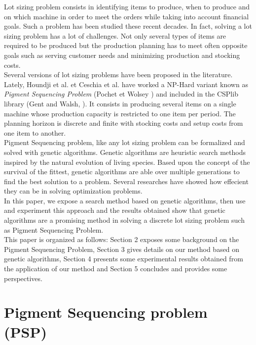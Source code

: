 \documentclass[twocolumn,10pt]{asme2ej}
\begin{document}
Lot sizing problem consists in identifying items to produce, when to produce and on which machine in order to meet the orders while taking into account financial goals. Such a problem has been studied these recent decades. In fact, solving a lot sizing problem has a lot of challenges. Not only several types of items are required to be produced but the production planning has to meet often opposite goals such as serving customer needs and minimizing production and stocking costs.\\
Several versions of lot sizing problems have been proposed in the literature. Lately,  Houndji et al. \cite{ratheil_stocking_paper}
et Ceschia et al. \cite{ceschia_opthub} have worked a NP-Hard variant known as \emph{Pigment Sequencing Problem}  (Pochet
et Wolsey \cite{wolsey_mip_paper}) and included in the CSPlib library (Gent and Walsh, \cite{gent_walsh_paper}). It consists in producing several items on a single machine whose production capacity is restricted to one item per period. The planning horizon is discrete and finite with stocking costs and setup costs from one item to another. \\
Pigment Sequencing problem, like any lot sizing problem can be formalized and solved with genetic algorithms. Genetic algorithms are heuristic search methods inspired by the natural evolution of living species. Based upon the concept of the survival of the fittest, genetic algorithms are able over multiple generations to find the best solution to a problem. Several researches \cite{mendes_paper} \cite{non_binary_paper} have showed how effecient they can be in solving optimization problems. \\
In this paper, we expose a search method based on genetic algorithms, then use and experiment this approach and the results obtained show that genetic algorithms are a promising method in solving a discrete lot sizing problem such as Pigment Sequencing Problem.  \\
This paper is organized as follows: Section 2 exposes some background on the Pigment Sequencing Problem, Section 3 gives details on our method based on genetic algorithms, Section 4 presents some experimental results obtained from the application of our method and Section 5 concludes and provides some perspectives.


\section{Pigment Sequencing problem (PSP)}
\end{document}
